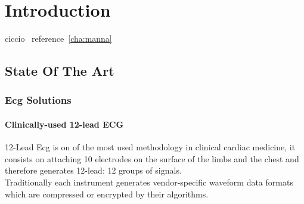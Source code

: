 
\chapter{Introduction}
ciccio~\label{cha:manna}
reference~\ref{cha:manna}

\section{State Of The Art}
\subsection{Ecg Solutions}
\subsubsection{Clinically-used 12-lead ECG}
12-Lead Ecg is on of the most used methodology in clinical cardiac medicine, it consists on attaching 10 electrodes on the surface of the limbs and the chest and therefore generates 12-lead: 12 groups of signals.\\
Traditionally each instrument generates vendor-specific waveform data formats which are compressed or encrypted by their algorithms.\cite{Hsieh2012}
